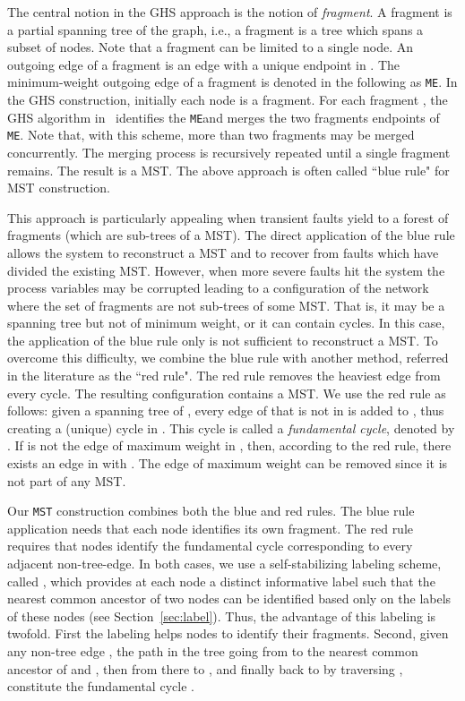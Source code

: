 \documentclass[11pt,a4paper]{article}
\newcommand{\MF}{\mbox{\tt ME}}
\newcommand{\MST}{\mbox{\tt MST}}
\begin{document}
The central notion in the GHS approach is the notion of \textit{fragment}.
A fragment is a partial spanning tree of the graph, i.e., a fragment is a tree which spans a subset of nodes.
Note that a fragment can be limited to a single node.
An outgoing edge of a fragment  is an edge with a unique endpoint in .
The minimum-weight outgoing edge of a fragment  is denoted in the following as \MF.
In the GHS construction, initially each node is a fragment.
For each fragment , the GHS algorithm in~\cite{GallagerHS83} identifies 
the \MF and merges the two fragments endpoints of \MF. 
Note that, with this scheme, more than two fragments may be merged concurrently. The merging process is recursively repeated until a single 
fragment remains. The result is a MST. The above approach is often 
called ``blue rule" for MST construction.

This approach is particularly appealing 
when transient faults yield to a forest of fragments (which are sub-trees of a MST).
The direct application of the blue rule allows the system to reconstruct a MST and to recover from faults which have divided the existing MST. 
However, when more severe faults hit the system 
the process variables may be corrupted leading to 
a configuration of the network where the 
set of fragments are not sub-trees of some MST. 
That is, it may be a spanning tree but not of minimum weight, 
or it can contain cycles. In this case, 
the application of the blue rule only is not sufficient to reconstruct a MST. 
To overcome this difficulty, we combine the blue rule 
with another method, referred in the literature as the ``red rule".
The red rule removes the heaviest edge from every cycle. 
The resulting configuration contains a MST. 
We use the red rule as follows: given a 
spanning tree  of , every edge  of  that is 
not in  is added to , thus creating a (unique) cycle in .
This cycle is called a \textit{fundamental cycle}, denoted by . 
If  is not the edge of maximum weight in , then, according to the red rule, there exists an edge  in  with . 
The edge of maximum weight can be removed since it is not part of any MST. 

Our \MST\/ construction combines both the blue and red rules.
The blue rule application needs that each node identifies its own fragment.
The red rule requires that nodes identify the fundamental cycle corresponding to every adjacent non-tree-edge.
In both cases, we use a self-stabilizing 
labeling scheme, called , which 
provides at each node a distinct informative label such that  
the nearest common ancestor 
of two nodes can be identified based only on the 
labels of these nodes (see Section~\ref{sec:label}). 
Thus, the advantage of this labeling 
is twofold. First the labeling helps nodes to identify their fragments.
Second, given any non-tree edge , the path in 
the tree going from  to the nearest common ancestor of  and , then 
from there to , and finally back to  by traversing 
, constitute the fundamental cycle .
\end{document}
